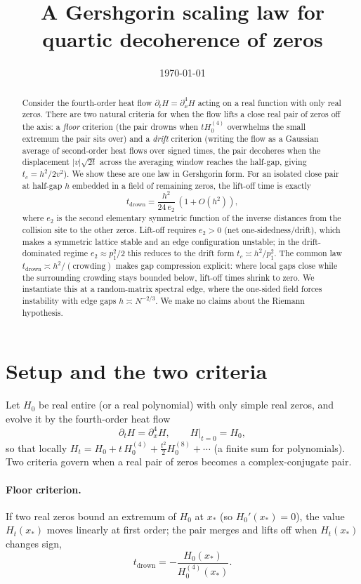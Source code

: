 \documentclass[11pt]{article}
\title{A Gershgorin scaling law for quartic decoherence of zeros}
\author{}
\date{\today}
\theoremstyle{plain}
\theoremstyle{definition}
\theoremstyle{remark}
\newcommand{\dt}{\partial_t}
\newcommand{\dx}{\partial_x}
\newcommand{\abs}[1]{\lvert #1\rvert}
\begin{document}
\maketitle

\begin{abstract}
Consider the fourth-order heat flow $\dt H=\dx^4H$ acting on a real function with
only real zeros. There are two natural criteria for when the flow lifts a close
real pair of zeros off the axis: a \emph{floor} criterion (the pair drowns when
$tH_0^{(4)}$ overwhelms the small extremum the pair sits over) and a
\emph{drift} criterion (writing the flow as a Gaussian average of second-order
heat flows over signed times, the pair decoheres when the displacement
$\abs v\sqrt{2t}$ across the averaging window reaches the half-gap, giving
$t_c=h^2/2v^2$). We show these are one law in Gershgorin form. For an isolated
close pair at half-gap $h$ embedded in a field of remaining zeros, the lift-off
time is exactly
\[
   t_{\mathrm{drown}}=\frac{h^2}{24\,e_2}\,(1+O(h^2)),
\]
where $e_2$ is the second elementary symmetric function of the inverse distances
from the collision site to the other zeros. Lift-off requires $e_2>0$ (net
one-sidedness/drift), which makes a symmetric lattice stable and an edge
configuration unstable; in the drift-dominated regime $e_2\approx p_1^2/2$ this
reduces to the drift form $t_c\asymp h^2/p_1^2$. The common law
$t_{\mathrm{drown}}\asymp h^2/(\text{crowding})$ makes gap compression explicit:
where local gaps close while the surrounding crowding stays bounded below,
lift-off times shrink to zero. We instantiate this at a random-matrix spectral
edge, where the one-sided field forces instability with edge gaps $h\asymp
N^{-2/3}$. We make no claims about the Riemann hypothesis.
\end{abstract}

\section{Setup and the two criteria}
Let $H_0$ be real entire (or a real polynomial) with only simple real zeros, and
evolve it by the fourth-order heat flow
\begin{equation}\label{eq:flow}
  \dt H=\dx^{4}H,\qquad H|_{t=0}=H_0,
\end{equation}
so that locally $H_t=H_0+t\,H_0^{(4)}+\tfrac{t^2}{2}H_0^{(8)}+\cdots$ (a finite
sum for polynomials). Two criteria govern when a real pair of zeros becomes a
complex-conjugate pair.

\paragraph{Floor criterion.} If two real zeros bound an extremum of $H_0$ at
$x_*$ (so $H_0'(x_*)=0$), the value $H_t(x_*)$ moves linearly at first order; the
pair merges and lifts off when $H_t(x_*)$ changes sign,
\begin{equation}\label{eq:floor}
  t_{\mathrm{drown}}=-\frac{H_0(x_*)}{H_0^{(4)}(x_*)} .
\end{equation}
\end{document}
